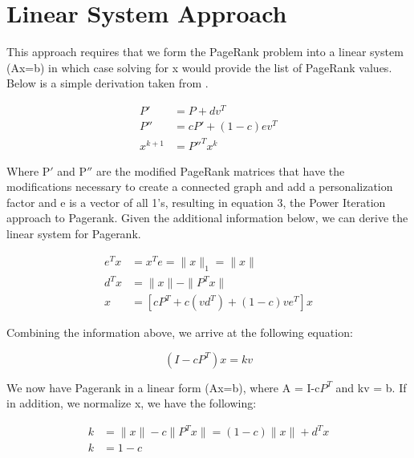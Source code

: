 \documentclass[a4paper,10pt]{article}
\begin{document}
\section{Linear System Approach}
This approach requires that we form the PageRank problem into a linear system (Ax=b) in which case solving for x would provide the list of PageRank values. Below is a simple derivation taken from \cite{Fast Parallel}.
\begin{center}
\begin{align}
	P' &= P + dv^{T} \\
	P'' &= cP' + (1-c)ev^{T} \\
	x^{k+1} &= P''^{T}x^{k}
\end{align}

\end{center}
Where P$'$ and P$''$ are the modified PageRank matrices that have the modifications necessary to create a connected graph and add a personalization factor and e is a vector of all 1's, resulting in equation 3, the Power Iteration approach to Pagerank.
\newline
\linebreak
Given the additional information below, we can derive the linear system for Pagerank.


\begin{center}
\begin{align}
  e^{T}x & = x^{T}e = \|x\|_{1} = \|x\| \\
  d^{T}x &= \| x\| - \| P^{T}x\| \\
  x &= [cP^{T} + c(vd^{T}) + (1-c)ve^{T}]x
\end{align}
\end{center}

Combining the information above, we arrive at the following equation:

\begin{center}
\begin{equation}
  (I-cP^{T})x = kv
\end{equation}
\end{center}
We now have Pagerank in a linear form (Ax=b), where A = I-c$P^{T}$ and kv = b. If in addition, we normalize x, we have the following:

\begin{center}
  \begin{align}
	k &= \|x\| - c \|P^{T}x\| = (1-c) \|x\| + d^{T}x \\	
	k &= 1-c 
  \end{align}
\end{center}
\end{document}
